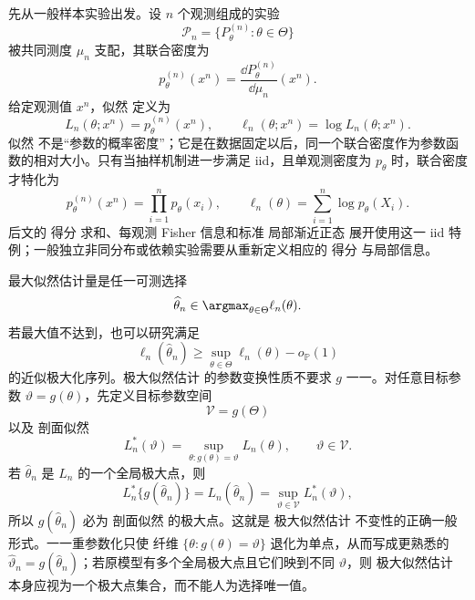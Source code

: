 \begin{definition}[样本似然]
先从一般样本实验出发。设 $n$ 个观测组成的实验
\[
 \mathcal P_n=\{P_\theta^{(n)}:\theta\in\Theta\}
\]
被共同测度 $\mu_n$ 支配，其联合密度为
\[
 p_\theta^{(n)}(x^n)
 =\frac{\dd P_\theta^{(n)}}{\dd\mu_n}(x^n).
\]
给定观测值 $x^n$，似然 定义为
\begin{equation}\label{eq:math-stat-general-likelihood}
 L_n(\theta;x^n)=p_\theta^{(n)}(x^n),
 \qquad
 \ell_n(\theta;x^n)=\log L_n(\theta;x^n).
\end{equation}
似然 不是“参数的概率密度”；它是在数据固定以后，同一个联合密度作为参数函数的相对大小。只有当抽样机制进一步满足 iid，且单观测密度为 $p_\theta$ 时，联合密度才特化为
\[
 p_\theta^{(n)}(x^n)=\prod_{i=1}^np_\theta(x_i),
 \qquad
 \ell_n(\theta)=\sum_{i=1}^n\log p_\theta(X_i).
\]
后文的 得分 求和、每观测 Fisher 信息和标准 局部渐近正态 展开使用这一 iid 特例；一般独立非同分布或依赖实验需要从重新定义相应的 得分 与局部信息。
\end{definition}

\begin{definition}[极大似然与剖面不变性]
最大似然估计量是任一可测选择
\[
 \widehat\theta_n
 \in\argmax_{\theta\in\Theta}\ell_n(\theta).
\]
若最大值不达到，也可以研究满足
\[
 \ell_n(\widehat\theta_n)
 \ge\sup_{\theta\in\Theta}\ell_n(\theta)-o_{\mathbb P}(1)
\]
的近似极大化序列。极大似然估计 的参数变换性质不要求 $g$ 一一。对任意目标参数 $\vartheta=g(\theta)$，先定义目标参数空间
\[
 \mathcal V=g(\Theta)
\]
以及 剖面似然
\begin{equation*}L_n^*(\vartheta)
 =\sup_{\theta:g(\theta)=\vartheta}L_n(\theta),
 \qquad \vartheta\in\mathcal V.
\end{equation*}
若 $\widehat\theta_n$ 是 $L_n$ 的一个全局极大点，则
\[
 L_n^*\{g(\widehat\theta_n)\}
 =L_n(\widehat\theta_n)
 =\sup_{\vartheta\in\mathcal V}L_n^*(\vartheta),
\]
所以 $g(\widehat\theta_n)$ 必为 剖面似然 的极大点。这就是 极大似然估计 不变性的正确一般形式。一一重参数化只使 纤维 $\{\theta:g(\theta)=\vartheta\}$ 退化为单点，从而写成更熟悉的 $\widehat\vartheta_n=g(\widehat\theta_n)$；若原模型有多个全局极大点且它们映到不同 $\vartheta$，则 极大似然估计 本身应视为一个极大点集合，而不能人为选择唯一值。
\end{definition}

